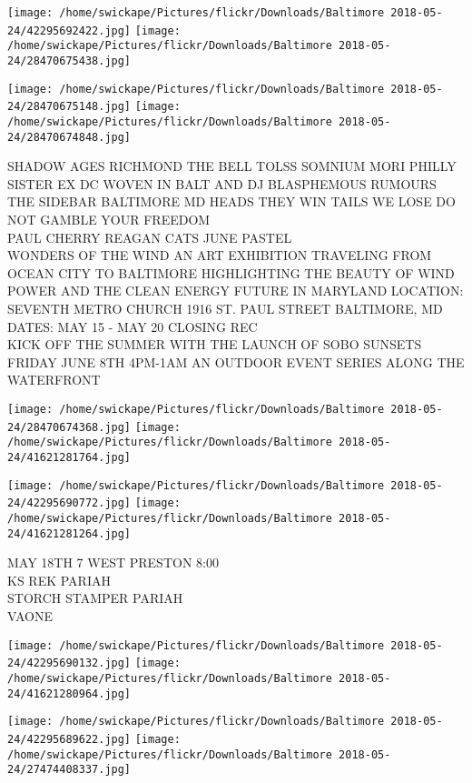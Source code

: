 \documentclass[10pt,letterpaper]{article}
\begin{document}
\texttt{[image: /home/swickape/Pictures/flickr/Downloads/Baltimore 2018-05-24/42295692422.jpg]}
\texttt{[image: /home/swickape/Pictures/flickr/Downloads/Baltimore 2018-05-24/28470675438.jpg]}

\texttt{[image: /home/swickape/Pictures/flickr/Downloads/Baltimore 2018-05-24/28470675148.jpg]}
\texttt{[image: /home/swickape/Pictures/flickr/Downloads/Baltimore 2018-05-24/28470674848.jpg]}

SHADOW AGES RICHMOND THE BELL TOLSS SOMNIUM MORI PHILLY SISTER EX DC WOVEN IN BALT AND DJ BLASPHEMOUS RUMOURS THE SIDEBAR BALTIMORE MD HEADS THEY WIN TAILS WE LOSE DO NOT GAMBLE YOUR FREEDOM\\
PAUL CHERRY REAGAN CATS JUNE PASTEL\\
WONDERS OF THE WIND AN ART EXHIBITION TRAVELING FROM OCEAN CITY TO BALTIMORE HIGHLIGHTING THE BEAUTY OF WIND POWER AND THE CLEAN ENERGY FUTURE IN MARYLAND LOCATION: SEVENTH METRO CHURCH 1916 ST. PAUL STREET BALTIMORE, MD DATES: MAY 15 {-} MAY 20 CLOSING REC\\
KICK OFF THE SUMMER WITH THE LAUNCH OF SOBO SUNSETS FRIDAY JUNE 8TH 4PM{-}1AM AN OUTDOOR EVENT SERIES ALONG THE WATERFRONT
\pagebreak

\texttt{[image: /home/swickape/Pictures/flickr/Downloads/Baltimore 2018-05-24/28470674368.jpg]}
\texttt{[image: /home/swickape/Pictures/flickr/Downloads/Baltimore 2018-05-24/41621281764.jpg]}

\texttt{[image: /home/swickape/Pictures/flickr/Downloads/Baltimore 2018-05-24/42295690772.jpg]}
\texttt{[image: /home/swickape/Pictures/flickr/Downloads/Baltimore 2018-05-24/41621281264.jpg]}

MAY 18TH 7 WEST PRESTON 8:00\\
KS REK PARIAH\\
STORCH STAMPER PARIAH\\
VAONE
\pagebreak

\texttt{[image: /home/swickape/Pictures/flickr/Downloads/Baltimore 2018-05-24/42295690132.jpg]}
\texttt{[image: /home/swickape/Pictures/flickr/Downloads/Baltimore 2018-05-24/41621280964.jpg]}

\texttt{[image: /home/swickape/Pictures/flickr/Downloads/Baltimore 2018-05-24/42295689622.jpg]}
\texttt{[image: /home/swickape/Pictures/flickr/Downloads/Baltimore 2018-05-24/27474408337.jpg]}
\end{document}
